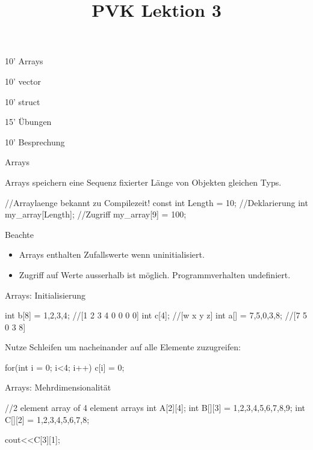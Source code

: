 \ifnum\conditionmacro=1 \documentclass[handout,usenames,dvipsnames]{beamer}\fi
\begin{document}
\title{PVK Lektion 3}

\maketitle

\begin{TFTimeSchedule}
\item 10' Arrays
\item 10' vector
\item 10' struct
\item 15' Übungen
\item 10' Besprechung
\end{TFTimeSchedule}

\begin{frame}[fragile]{Arrays}

Arrays speichern eine Sequenz fixierter Länge von Objekten gleichen Typs.

\begin{TPCpp}
//Arraylaenge bekannt zu Compilezeit!
const int Length = 10;
//Deklarierung
int my_array[Length];
//Zugriff
my_array[9] = 100;
\end{TPCpp}

\begin{block}{Beachte}
\begin{itemize}
\item Arrays enthalten Zufallswerte wenn uninitialisiert.
\item Zugriff auf Werte ausserhalb ist möglich. Programmverhalten undefiniert. 
\end{itemize}
\end{block}
\end{frame}

\begin{frame}[fragile]{Arrays: Initialisierung}
\begin{TPCpp}
int b[8] = {1,2,3,4}; //[1 2 3 4 0 0 0 0]
int c[4]; //[w x y z]
int a[] = {7,5,0,3,8}; //[7 5 0 3 8]
\end{TPCpp}

Nutze Schleifen um nacheinander auf alle Elemente zuzugreifen:

\begin{TPCpp}
for(int i = 0; i<4; i++){
	c[i] = 0;
}
\end{TPCpp}
\end{frame}

\begin{frame}[fragile]{Arrays: Mehrdimensionalität}
\begin{TPCpp}
//2 element array of 4 element arrays
int A[2][4];
int B[][3] = {{1,2,3},{4,5,6},{7,8,9}};
int C[][2] = {1,2,3,4,5,6,7,8};

cout<<C[3][1];
\end{TPCpp}
\end{frame}
\end{document}
